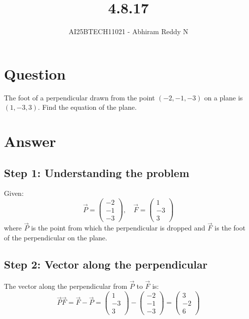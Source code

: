 \documentclass[journal]{IEEEtran}
\begin{document}

\vspace{3cm}

\title{4.8.17}
\author{AI25BTECH11021 - Abhiram Reddy N}
{\let\newpage\relax\maketitle}

\renewcommand{\thefigure}{\theenumi}
\renewcommand{\thetable}{\theenumi}
\setlength{\intextsep}{10pt} %


\renewcommand{\thetable}{\theenumi}


\section*{Question}
The foot of a perpendicular drawn from the point \((-2, -1, -3)\) on a plane is \((1, -3, 3)\). Find the equation of the plane.

\section*{Answer}

\subsection*{\textbf{Step 1}: Understanding the problem}
Given:
\[
\vec{P} = \begin{pmatrix} -2 \\ -1 \\ -3 \end{pmatrix}, \quad
\vec{F} = \begin{pmatrix} 1 \\ -3 \\ 3 \end{pmatrix}
\]
where \(\vec{P}\) is the point from which the perpendicular is dropped and \(\vec{F}\) is the foot of the perpendicular on the plane.

\subsection*{\textbf{Step 2}: Vector along the perpendicular}
The vector along the perpendicular from \(\vec{P}\) to \(\vec{F}\) is:
\[
\vec{P}\vec{F} = \vec{F} - \vec{P} = \begin{pmatrix} 1 \\ -3 \\ 3 \end{pmatrix} - \begin{pmatrix} -2 \\ -1 \\ -3 \end{pmatrix} = \begin{pmatrix} 3 \\ -2 \\ 6 \end{pmatrix}
\]
\end{document}
